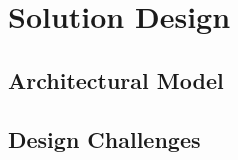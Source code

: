 \section{Solution Design}


\subsection{Architectural Model}







\subsection{Design Challenges}








